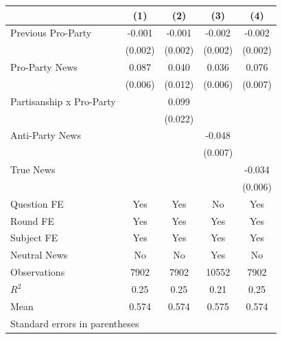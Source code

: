 \begin{tabular}{l*{4}{c}}
\hline\hline
                                   &\multicolumn{1}{c}{(1)}&\multicolumn{1}{c}{(2)}&\multicolumn{1}{c}{(3)}&\multicolumn{1}{c}{(4)}\\
\hline
Previous Pro-Party                 &   -0.001&   -0.001&   -0.002&   -0.002\\
                                   &  (0.002)&  (0.002)&  (0.002)&  (0.002)\\
Pro-Party News                     &    0.087&    0.040&    0.036&    0.076\\
                                   &  (0.006)&  (0.012)&  (0.006)&  (0.007)\\
Partisanship x Pro-Party           &         &    0.099&         &         \\
                                   &         &  (0.022)&         &         \\
Anti-Party News                    &         &         &   -0.048&         \\
                                   &         &         &  (0.007)&         \\
True News                          &         &         &         &   -0.034\\
                                   &         &         &         &  (0.006)\\
Question FE                        &      Yes&      Yes&       No&      Yes\\
Round FE                           &      Yes&      Yes&      Yes&      Yes\\
Subject FE                         &      Yes&      Yes&      Yes&      Yes\\
Neutral News                       &       No&       No&      Yes&       No\\
\hline
Observations                       &     7902&     7902&    10552&     7902\\
\(R^{2}\)                          &     0.25&     0.25&     0.21&     0.25\\
Mean                               &    0.574&    0.574&    0.575&    0.574\\
\hline\hline
\multicolumn{5}{l}{\footnotesize Standard errors in parentheses}\\
\end{tabular}
